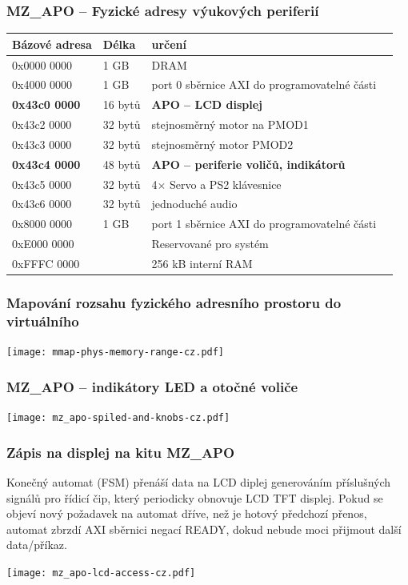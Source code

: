 \documentclass{beamer}
\begin{document}
\begin{frame}
\frametitle{MZ\_APO -- Fyzické adresy výukových periferií}

\begin{tabular}{|l|l|l|l|} \hline
Bázové adresa & Délka & určení \\\hline
0x0000 0000 & 1 GB &  DRAM \\\hline
0x4000 0000 & 1 GB & port 0 sběrnice AXI do programovatelné části \\\hline
\textbf{0x43c0 0000} & 16 bytů & \textbf{APO -- LCD displej} \\\hline
0x43c2 0000 & 32 bytů & stejnosměrný motor na PMOD1 \\\hline
0x43c3 0000 & 32 bytů & stejnosměrný motor PMOD2 \\\hline
\textbf{0x43c4 0000} & 48 bytů & \textbf{APO -- periferie voličů, indikátorů} \\\hline
0x43c5 0000 & 32 bytů & 4$\times$ Servo a PS2 klávesnice \\\hline
0x43c6 0000 & 32 bytů & jednoduché audio \\\hline
0x8000 0000 & 1 GB & port 1 sběrnice AXI do programovatelné části \\\hline
0xE000 0000 &      & Reservované pro systém\\\hline
0xFFFC 0000 &      & 256 kB interní RAM \\\hline

\end{tabular} 

\end{frame}


\begin{frame}
\frametitle{Mapování rozsahu fyzického adresního prostoru do virtuálního}

\texttt{[image: mmap-phys-memory-range-cz.pdf]}

\end{frame}

\begin{frame}
\frametitle{MZ\_APO -- indikátory LED a otočné voliče}

\texttt{[image: mz\_apo-spiled-and-knobs-cz.pdf]}

\end{frame}

\begin{frame}
\frametitle{Zápis na displej na kitu MZ\_APO}

Konečný automat (FSM) přenáší data na LCD diplej generováním příslušných signálů pro řídicí čip, který periodicky obnovuje LCD TFT displej.
Pokud se objeví nový požadavek na automat dříve, než je hotový předchozí přenos, automat zbrzdí AXI sběrnici negací READY, dokud nebude moci přijmout další data/příkaz.

\texttt{[image: mz\_apo-lcd-access-cz.pdf]}

\end{frame}
\end{document}
